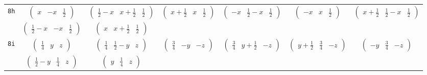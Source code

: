 \documentclass[fleqn,9pt,landscape]{jsarticle}
\begin{document}
\begin{center}
\begin{longtable}{ccccccc}
{\tt 8h} & $ \begin{pmatrix} x & - x & \frac{1}{2} \end{pmatrix} $ & $ \begin{pmatrix} \frac{1}{2} - x & x + \frac{1}{2} & \frac{1}{2} \end{pmatrix} $ & $ \begin{pmatrix} x + \frac{1}{2} & x & \frac{1}{2} \end{pmatrix} $ & $ \begin{pmatrix} - x & \frac{1}{2} - x & \frac{1}{2} \end{pmatrix} $ & $ \begin{pmatrix} - x & x & \frac{1}{2} \end{pmatrix} $ & $ \begin{pmatrix} x + \frac{1}{2} & \frac{1}{2} - x & \frac{1}{2} \end{pmatrix} $ \\
& $ \begin{pmatrix} \frac{1}{2} - x & - x & \frac{1}{2} \end{pmatrix} $ & $ \begin{pmatrix} x & x + \frac{1}{2} & \frac{1}{2} \end{pmatrix} $ & $  $ & $  $ & $  $ & $  $ \\ \hline
{\tt 8i} & $ \begin{pmatrix} \frac{1}{4} & y & z \end{pmatrix} $ & $ \begin{pmatrix} \frac{1}{4} & \frac{1}{2} - y & z \end{pmatrix} $ & $ \begin{pmatrix} \frac{3}{4} & - y & - z \end{pmatrix} $ & $ \begin{pmatrix} \frac{3}{4} & y + \frac{1}{2} & - z \end{pmatrix} $ & $ \begin{pmatrix} y + \frac{1}{2} & \frac{3}{4} & - z \end{pmatrix} $ & $ \begin{pmatrix} - y & \frac{3}{4} & - z \end{pmatrix} $ \\
& $ \begin{pmatrix} \frac{1}{2} - y & \frac{1}{4} & z \end{pmatrix} $ & $ \begin{pmatrix} y & \frac{1}{4} & z \end{pmatrix} $ & $  $ & $  $ & $  $ & $  $ \\ \hline

\end{longtable}
\end{center}
\end{document}

